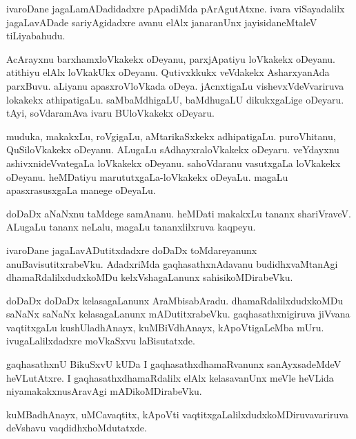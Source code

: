 \documentclass{article}
\begin{document}
\begin{mn}
ivaroDane jagaLamADadidadxre pApadiMda pArAgutAtxne. ivara
viSayadalilx jagaLavADade sariyAgidadxre avanu elAlx janaranUnx
jayisidaneMtaleV tiLiyabahudu.
\end{mn}

\begin{mn}%
AcArayxnu barxhamxloVkakekx oDeyanu, parxjApatiyu loVkakekx
oDeyanu. atithiyu elAlx loVkakUkx oDeyanu. Qutivxkkukx veVdakekx
AsharxyanAda parxBuvu. aLiyanu apasxroVloVkada oDeya. jAcnxtigaLu
vishevxVdeVvariruva lokakekx athipatigaLu. saMbaMdhigaLU, baMdhugaLU
dikukxgaLige oDeyaru. tAyi, soVdaramAva ivaru BUloVkakekx oDeyaru.
\end{mn}

\begin{mn}%
muduka, makakxLu, roVgigaLu, aMtarikaSxkekx adhipatigaLu. puroVhitanu,
QuSiloVkakekx oDeyanu. ALugaLu sAdhayxraloVkakekx oDeyaru. veYdayxnu
ashivxnideVvategaLa loVkakekx oDeyanu. sahoVdaranu vasutxgaLa
loVkakekx oDeyanu. heMDatiyu marututxgaLa-loVkakekx oDeyaLu. magaLu
apasxrasusxgaLa manege oDeyaLu.
\end{mn}

\begin{mn}
doDaDx aNaNxnu taMdege samAnanu. heMDati makakxLu tananx
shariVraveV. ALugaLu tananx neLalu, magaLu tananxlilxruva kaqpeyu.
\end{mn}

\begin{mn}
ivaroDane jagaLavADutitxdadxre doDaDx toMdareyanunx
anuBavisutitxrabeVku. AdadxriMda gaqhasathxnAdavanu budidhxvaMtanAgi
dhamaRdalilxdudxkoMDu kelxVshagaLanunx sahisikoMDirabeVku.
\end{mn}

\begin{mn}
doDaDx doDaDx kelasagaLanunx AraMbisabAradu. dhamaRdalilxdudxkoMDu
saNaNx saNaNx kelasagaLanunx mADutitxrabeVku. gaqhasathxnigiruva
jiVvana vaqtitxgaLu kushUladhAnayx, kuMBiVdhAnayx, kApoVtigaLeMba
mUru. ivugaLalilxdadxre moVkaSxvu laBisutatxde.
\end{mn}

\begin{mn}
gaqhasathxnU BikuSxvU kUDa I gaqhasathxdhamaRvanunx sanAyxsadeMdeV
heVLutAtxre. I gaqhasathxdhamaRdalilx elAlx kelasavanUnx meVle heVLida
niyamakakxnusAravAgi mADikoMDirabeVku.
\end{mn}

\begin{mn}%
kuMBadhAnayx, uMCavaqtitx, kApoVti
vaqtitxgaLalilxdudxkoMDiruvavariruva deVshavu vaqdidhxhoMdutatxde.
\end{mn}
\end{document}
